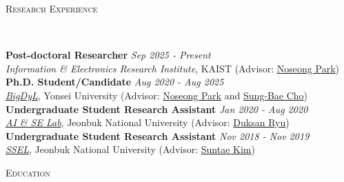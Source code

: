 \documentclass[10pt]{article}
\newenvironment{changemargin}[2]{
  \begin{list}{}{
    \setlength{\topsep}{0pt}
    \setlength{\leftmargin}{#1}
    \setlength{\rightmargin}{#2}
    \setlength{\listparindent}{\parindent}
    \setlength{\itemindent}{\parindent}
    \setlength{\parsep}{\parskip}
  }
  \item[]}{\end{list}
}
\newcommand{\lineover}{
	\begin{changemargin}{-0.05in}{-0.05in}
		\vspace*{-8pt}
		\hrulefill \\
		\vspace*{-2pt}
	\end{changemargin}
}
\newcommand{\header}[1]{
	\begin{changemargin}{-0.5in}{-0.5in}
		\scshape{#1}\\
  	\lineover
	\end{changemargin}
}
\newenvironment{body} {
	\vspace*{-16pt}
	\begin{changemargin}{-0.25in}{-0.5in}
  }
	{\end{changemargin}
}
\begin{document}
\header{Research Experience}
\begin{body}
	\vspace{14pt}
	\textbf{Post-doctoral Researcher} \hfill \emph{Sep 2025 - Present} \\
	\emph{Information \& Electronics Research Institute}, KAIST (Advisor: {\href{https://scholar.google.com/citations?user=VSuM3gYAAAAJ}{Noseong Park}})\\
	\textbf{Ph.D. Student/Candidate} \hfill \emph{Aug 2020 - Aug 2025} \\
	\emph{\href{https://sites.google.com/view/npark}{BigDyL}}, Yonsei University (Advisor: \href{https://scholar.google.com/citations?user=VSuM3gYAAAAJ&hl=en}{Noseong Park} and \href{https://scholar.google.com/citations?user=px5LGgMAAAAJ&hl=en}{Sung-Bae Cho}) \\
	\textbf{Undergraduate Student Research Assistant} \hfill \emph{Jan 2020 - Aug 2020} \\
	\emph{\href{https://sites.google.com/view/aiselabjbnu}{AI \& SE Lab}}, Jeonbuk National University (Advisor: {\href{https://scholar.google.com/citations?user=BHue-MMAAAAJ&hl=en}{Duksan Ryu}})  \\
	\textbf{Undergraduate Student Research Assistant} \hfill \emph{Nov 2018 - Nov 2019} \\
	\emph{\href{https://sites.google.com/view/jbnussel/}{SSEL}}, Jeonbuk National University (Advisor: {\href{https://scholar.google.com/citations?user=IN_HTKEAAAAJ&hl=en}{Suntae Kim}})  \\
\end{body}
\medskip

\header{Education}
\end{document}

